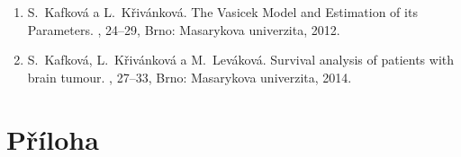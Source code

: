 \documentclass[a4paper,12pt]{report}
\theoremstyle{definition} \newtheorem{definice}[veta]{Definice}
\theoremstyle{remark}
\begin{document}
\begin{enumerate}
\item
S.~Kafková a L.~Křivánková.
\newblock The Vasicek Model and Estimation of its Parameters.
, 24--29, Brno: Masarykova univerzita, 2012.

\item
S.~Kafková, L.~Křivánková a M.~Leváková.
\newblock Survival analysis of patients with brain tumour.
, 27--33, Brno: Masarykova univerzita, 2014.


\end{enumerate}


\chapter[Příloha -- Ukázka datového souboru]{Příloha}\label{priloha_data}
\end{document}
